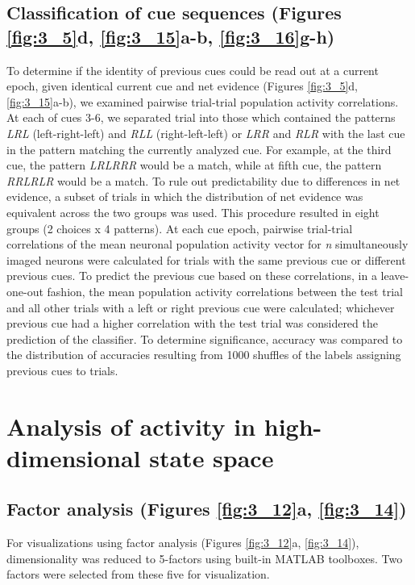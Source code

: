 \subsection[Classification of cue sequences]{Classification of cue sequences (Figures \ref{fig:3_5}d, \ref{fig:3_15}a-b, \ref{fig:3_16}g-h)} \label{methods:cue_seq_classifier}

To determine if the identity of previous cues could be read out at a current epoch, given identical current cue and net evidence (Figures \ref{fig:3_5}d, \ref{fig:3_15}a-b), we examined pairwise trial-trial population activity correlations. At each of cues 3-6, we separated trial into those which contained the patterns \textit{LRL} (left-right-left) and \textit{RLL} (right-left-left) or \textit{LRR} and \textit{RLR} with the last cue in the pattern matching the currently analyzed cue. For example, at the third cue, the pattern \textit{LRLRRR} would be a match, while at fifth cue, the pattern \textit{RRLRLR} would be a match. To rule out predictability due to differences in net evidence, a subset of trials in which the distribution of net evidence was equivalent across the two groups was used. This procedure resulted in eight groups (2 choices x 4 patterns). At each cue epoch, pairwise trial-trial correlations of the mean neuronal population activity vector for \textit{n} simultaneously imaged neurons were calculated for trials with the same previous cue or different previous cues. To predict the previous cue based on these correlations, in a leave-one-out fashion, the mean population activity correlations between the test trial and all other trials with a left or right previous cue were calculated; whichever previous cue had a higher correlation with the test trial was considered the prediction of the classifier. To determine significance, accuracy was compared to the distribution of accuracies resulting from 1000 shuffles of the labels assigning previous cues to trials. 

\section{Analysis of activity in high-dimensional state space }  \label{methods:high_d}

\subsection[Factor analysis]{Factor analysis (Figures \ref{fig:3_12}a, \ref{fig:3_14})} \label{methods:factor_analysis}
For visualizations using factor analysis (Figures \ref{fig:3_12}a, \ref{fig:3_14}), dimensionality was reduced to 5-factors using built-in MATLAB toolboxes. Two factors were selected from these five for visualization.  


